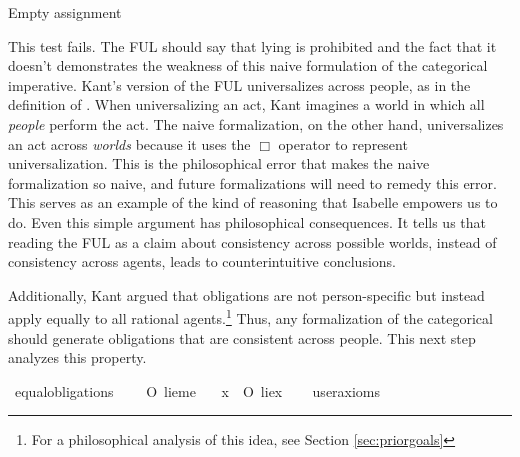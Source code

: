 \begin{isabellebody}
{  Empty assignment \color{black}%
}%
\endisatagproof
{\isafoldproof}%
%
\isadelimproof
%
\endisadelimproof
%
\begin{isamarkuptext}%
This test fails. The FUL should say that lying is prohibited and the fact that it
doesn't demonstrates the weakness of this naive formulation of the categorical imperative. Kant's version of
the FUL universalizes across people, as in the definition of . When universalizing
an act, Kant imagines a world in which all \emph{people} perform the act. The naive formalization, 
on the other hand, universalizes an act across \emph{worlds} because it uses the $\Box$ operator
to represent universalization. This is the philosophical error that makes the naive 
formalization so naive, and future formalizations will need to remedy this error.
This serves as an example of the kind of reasoning that 
Isabelle empowers us to do. Even this simple argument has philosophical consequences. It tells us that
reading the FUL as a claim about consistency across possible worlds, instead of consistency across 
agents, leads to counterintuitive conclusions.

Additionally, Kant argued that obligations are not person-specific but instead apply equally to all 
rational agents.\footnote{For a philosophical analysis of this idea, see Section \ref{sec:priorgoals}}
Thus, any formalization of the categorical should generate obligations that are consistent across people.
This next step analyzes this property.%
\end{isamarkuptext}\isamarkuptrue%
\isamarkupfalse%
\ equal{\isacharunderscore}obligations{\isacharcolon}\isanewline
\ \ \ {\isachardoublequoteopen}{\isasymTurnstile}\ O\ {\isacharbraceleft}{\isacharparenleft}lie{\isacharparenleft}me{\isacharparenright}{\isacharparenright}{\isacharbraceright}{\isachardoublequoteclose}\isanewline
\ \ \ {\isachardoublequoteopen}{\isasymforall}x{\isachardot}\ {\isasymTurnstile}\ {\isacharparenleft}O\ {\isacharbraceleft}{\isacharparenleft}lie{\isacharparenleft}x{\isacharparenright}{\isacharparenright}{\isacharbraceright}{\isacharparenright}{\isachardoublequoteclose}\isanewline
\ \ \isamarkupfalse%
\ {\isacharbrackleft}user{\isacharunderscore}axioms{\isacharbrackright}%
\isadelimproof
\ %
\endisadelimproof
%
\isatagproof
{}\isamarkupfalse%
\isanewline
%
\end{isabellebody}
